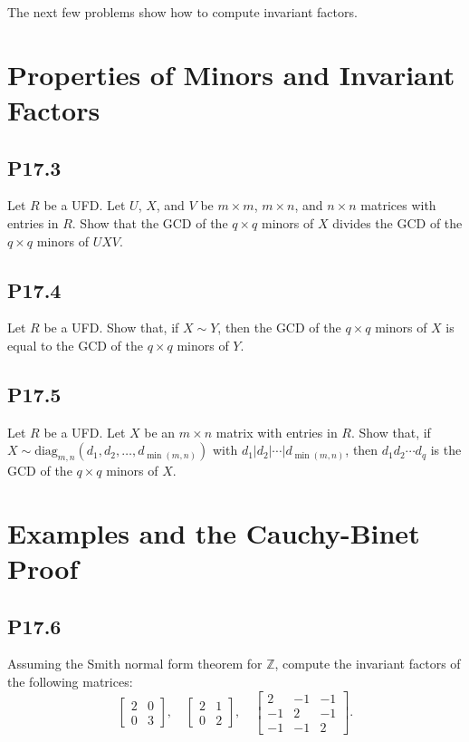 \documentclass[lang=cn,11pt]{template}
\begin{document}
The next few problems show how to compute invariant factors.

\section{Properties of Minors and Invariant Factors}

\subsection*{P17.3}
Let \( R \) be a UFD. Let \( U \), \( X \), and \( V \) be \( m \times m \), \( m \times n \), and \( n \times n \) matrices with entries in \( R \). Show that the GCD of the \( q \times q \) minors of \( X \) divides the GCD of the \( q \times q \) minors of \( U X V \).

\subsection*{P17.4}
Let \( R \) be a UFD. Show that, if \( X \sim Y \), then the GCD of the \( q \times q \) minors of \( X \) is equal to the GCD of the \( q \times q \) minors of \( Y \).

\subsection*{P17.5}
Let \( R \) be a UFD. Let \( X \) be an \( m \times n \) matrix with entries in \( R \). Show that, if \( X \sim \text{diag}_{m,n}(d_1, d_2, \ldots, d_{\min(m,n)}) \) with \( d_1 | d_2 | \cdots | d_{\min(m,n)} \), then \( d_1 d_2 \cdots d_q \) is the GCD of the \( q \times q \) minors of \( X \).

\section{Examples and the Cauchy-Binet Proof}

\subsection*{P17.6}
Assuming the Smith normal form theorem for \( \mathbb{Z} \), compute the invariant factors of the following matrices:
\[
\begin{bmatrix} 2 & 0 \\ 0 & 3 \end{bmatrix}, \quad \begin{bmatrix} 2 & 1 \\ 0 & 2 \end{bmatrix}, \quad \begin{bmatrix} 2 & -1 & -1 \\ -1 & 2 & -1 \\ -1 & -1 & 2 \end{bmatrix}.
\]
\end{document}
